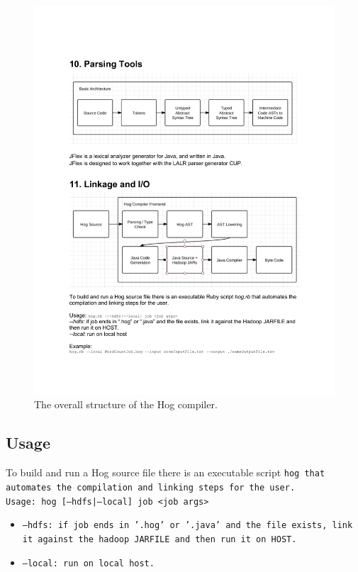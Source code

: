 \documentclass{book}
\begin{document}
\begin{center}
\begin{figure}
  \label{fig:hog_compiler}
  \includegraphics[width=1.0\textwidth]{img/hog_compiler.pdf}
  \caption{The overall structure of the Hog compiler.}
\end{figure}
\end{center}

\subsection{Usage} %
\label{sub:usage}


To build and run a Hog source file there is an executable script \tt hog
\rm that automates the compilation and linking steps for the user. \\

Usage: \tt hog [--hdfs|--local] job <job args> \rm
\begin{itemize}
  \item[] \tt --hdfs\rm: if job ends in '.hog' or '.java' and the file exists, link it against the hadoop JARFILE and then run it on HOST.
  \item[] \tt --local\rm: run on local host.
\end{itemize}
\end{document}
